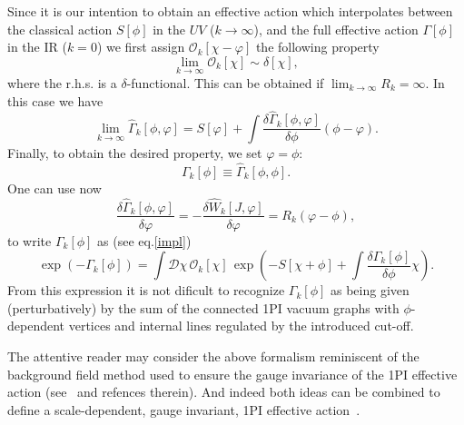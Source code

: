 \documentclass[a4paper,12pt]{article}
\begin{document}
Since it is our intention to obtain an effective action which interpolates between the classical action $S[\phi]$ in the $UV$ ($k\to\infty$), and the full effective action $\Gamma[\phi]$ in the IR ($k=0$) we first assign ${\mathcal O}_k[\chi-\varphi]$ the following property
\begin{equation}
                  \lim_{k\to\infty} {\mathcal O}_k[\chi] \sim \delta [\chi],
\end{equation}          
where the r.h.s. is a $\delta$-functional. This can be obtained if $\lim_{k\to\infty} R_k =\infty$. In this case we have
\begin{equation}
                  \lim_{k\to\infty} \widehat{\Gamma}_k[\phi,\varphi] = S[\varphi] + \int\frac{\delta \widehat{\Gamma}_k[\phi,\varphi]}{\delta \phi}(\phi-\varphi).
\end{equation}
Finally, to obtain the desired property, we set $\varphi=\phi$:
\begin{equation} 
                  \Gamma_k[\phi]\equiv\widehat{\Gamma}_k[\phi,\phi].
\end{equation}
One can use now
\begin{equation}\label{deriv}
           \frac{\delta \widehat{\Gamma}_k[\phi,\varphi]}{\delta\varphi}=-\frac{\delta \widehat{W}_k[J,\varphi]}{\delta\varphi}=R_k(\varphi-\phi),
\end{equation}
to write $\Gamma_k[\phi]$ as (see eq.\eqref{impl})
\begin{equation}
                \exp{\left(-\Gamma_k[\phi]\right)}=\int{\mathcal D}\chi\,{\mathcal O}_k[\chi]\,\exp{\left(-S[\chi+\phi]+\int\frac{\delta \Gamma_k[\phi]}{\delta \phi}\chi\right)}.
\end{equation}
From this expression it is not dificult to recognize $\Gamma_k[\phi]$ as being given (perturbatively) by the sum of the connected 1PI vacuum graphs with $\phi$-dependent vertices and internal lines regulated by the introduced cut-off. 

The attentive reader may consider the above formalism reminiscent of the background field method used to ensure the gauge invariance of the 1PI effective action (see~\cite{abb81} and refences therein). And indeed both ideas can be combined to define a scale-dependent, gauge invariant, 1PI effective action~\cite{reu94}.
\end{document}
